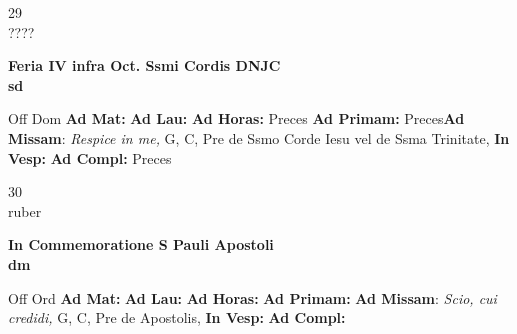 \documentclass[10pt, openany]{book}
\begin{document}
    \begin{center}
        \begin{minipage}{3.5in}
            \vspace{2em}
            \begin{minipage}{0.5in}
                {\Huge 29} \\
                {\normalsize ????}
            \end{minipage}
            \begin{minipage}{3.0in}
                \textbf{ \large Feria IV infra Oct. Ssmi Cordis DNJC \\
                \textnormal{\normalsize sd}}

            \end{minipage}
            \begin{justify}Off Dom
                \textbf{Ad Mat: }
                \textbf{Ad Lau: }
                \textbf{Ad Horas: }Preces
                \textbf{Ad Primam: }Preces\textbf{Ad Missam}: \textit{Respice in me,} G, C, Pre de Ssmo Corde Iesu vel de Ssma Trinitate, 
                \textbf{In Vesp: }
                \textbf{Ad Compl: }Preces
            \end{justify}
        \end{minipage}
    \end{center}

    \begin{center}
        \begin{minipage}{3.5in}
            \vspace{2em}
            \begin{minipage}{0.5in}
                {\Huge 30} \\
                {\normalsize ruber}
            \end{minipage}
            \begin{minipage}{3.0in}
                \textbf{ \large In Commemoratione S Pauli Apostoli \\
                \textnormal{\normalsize dm}}

            \end{minipage}
            \begin{justify}Off Ord
                \textbf{Ad Mat: }
                \textbf{Ad Lau: }
                \textbf{Ad Horas: }
                \textbf{Ad Primam: }\textbf{Ad Missam}: \textit{Scio, cui credidi,} G, C, Pre de Apostolis, 
                \textbf{In Vesp: }
                \textbf{Ad Compl: }
            \end{justify}
        \end{minipage}
    \end{center}
\end{document}
